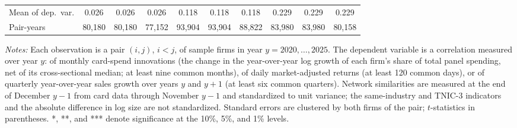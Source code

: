 \begin{table}
\begin{tabular*}{\linewidth}{@{\extracolsep{\fill}}lccccccccc}
Mean of dep.\ var. & 0.026 & 0.026 & 0.026 & 0.118 & 0.118 & 0.118 & 0.229 & 0.229 & 0.229 \\
Pair-years & 80,180 & 80,180 & 77,152 & 93,904 & 93,904 & 88,822 & 83,980 & 83,980 & 80,158 \\
\bottomrule
\end{tabular*}
\par\vspace{4pt}\begin{minipage}{\linewidth}\scriptsize \emph{Notes:} Each observation is a pair $(i,j)$, $i<j$, of sample firms in year $y=2020,\ldots,2025$. The dependent variable is a correlation measured over year $y$: of monthly card-spend innovations (the change in the year-over-year log growth of each firm's share of total panel spending, net of its cross-sectional median; at least nine common months), of daily market-adjusted returns (at least 120 common days), or of quarterly year-over-year sales growth over years $y$ and $y+1$ (at least six common quarters). Network similarities are measured at the end of December $y-1$ from card data through November $y-1$ and standardized to unit variance; the same-industry and TNIC-3 indicators and the absolute difference in log size are not standardized. Standard errors are clustered by both firms of the pair; $t$-statistics in parentheses. *, **, and *** denote significance at the 10\%, 5\%, and 1\% levels.\end{minipage}
\end{table}